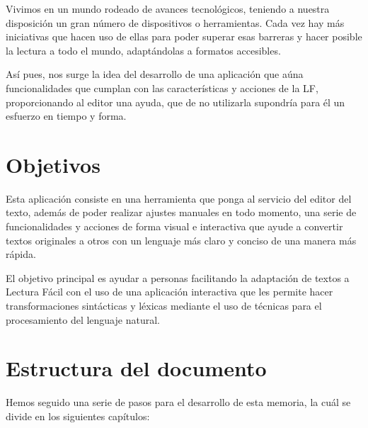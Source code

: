 \setlength{\parskip}{10pt}
Vivimos en un mundo rodeado de avances tecnológicos, teniendo a nuestra disposición un gran número de dispositivos o herramientas. Cada vez hay más iniciativas que hacen uso de ellas para poder superar esas barreras y hacer posible la lectura a todo el mundo, adaptándolas a formatos accesibles. 


\setlength{\parskip}{10pt} 
 
Así pues, nos surge la idea del desarrollo de una aplicación que aúna funcionalidades que cumplan con las características y acciones de la LF, proporcionando al editor una ayuda, que de no utilizarla supondría para él un esfuerzo en tiempo y forma.


\section{Objetivos}
Esta aplicación consiste en una herramienta que ponga al servicio del editor del texto, además de poder realizar ajustes manuales en todo momento, una serie de funcionalidades y acciones de forma visual e interactiva que ayude a convertir textos originales a otros con un lenguaje más claro y conciso de una manera más rápida.  

 \setlength{\parskip}{10pt}
 
El objetivo principal es ayudar a personas facilitando la adaptación de textos a Lectura Fácil con el uso de una aplicación interactiva que les permite hacer transformaciones sintácticas y léxicas mediante el uso de técnicas para el procesamiento del lenguaje natural. 

 

\section{Estructura del documento}


Hemos seguido una serie de pasos para el desarrollo de esta memoria, la cuál se divide en los siguientes capítulos:

